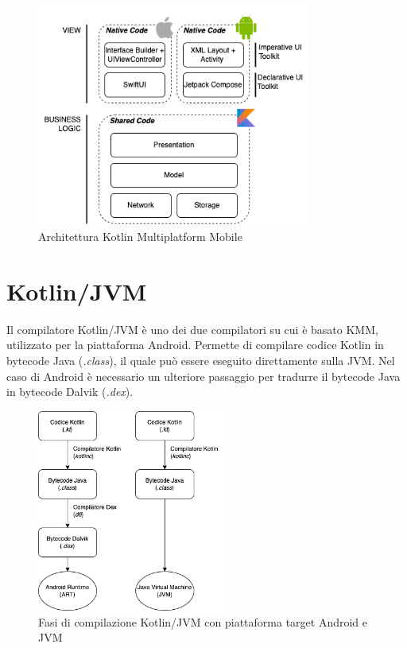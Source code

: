 \begin{figure}[H]
\centering
\includegraphics[width=0.8\textwidth]{img/tesi-8-kmm.drawio.png}
\caption{Architettura Kotlin Multiplatform Mobile}
\end{figure}

\section{Kotlin/JVM}
Il compilatore Kotlin/JVM è uno dei due compilatori su cui è basato KMM, utilizzato per la piattaforma Android. Permette di compilare codice Kotlin in bytecode Java (\textit{.class}), il quale può essere eseguito direttamente sulla JVM. Nel caso di Android è necessario un ulteriore passaggio per tradurre il bytecode Java in bytecode Dalvik (\textit{.dex}).

\begin{figure}[H]
\centering
\includegraphics[width=0.55\textwidth]{img/tesi-9-kotlinjvm.drawio.png}
\caption{Fasi di compilazione Kotlin/JVM con piattaforma target Android e JVM}
\end{figure}

